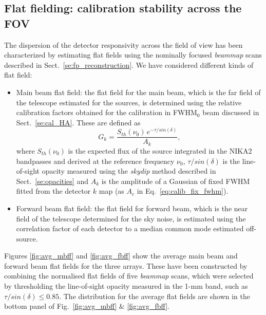 \subsection{Flat fielding: calibration stability across the FOV}


The dispersion of the detector responsivity across the field of view has been characterized by estimating flat fields using the nominally focused \emph{beammap} scans described in Sect.~\ref{se:fp_reconstruction}. We have considered different kinds of flat field:
\begin{itemize}
\item Main beam flat field: the flat field for the main beam, which is the far field of the telescope estimated for the sources, is determined using the relative calibration factors obtained for the calibration in FWHM$_{0}$ beam discussed in Sect.~\ref{se:cal_HA}. These are defined as
  \begin{equation}
    G_k = \frac{S_{th}(\nu_0)\, e^{-\tau/sin(\delta)}}{A_k}, 
  \end{equation}
  where $S_{th}(\nu_0)$ is the expected flux of the source integrated in the NIKA2 bandpasses and derived at the reference frequency $\nu_0$, $\tau/sin(\delta)$ is the line-of-sight opacity measured using the \emph{skydip} method described in Sect.~\ref{se:opacities} and $A_k$ is the amplitude of a Gaussian of fixed FWHM fitted from the detector $k$ map (as $A_{c}$ in Eq.~\ref{eq:calib_fix_fwhm}).
\item Forward beam flat field: the flat field for forward beam, which is the near field of the telescope determined for the sky noise, is estimated using the correlation factor of each detector to a median common mode estimated off-source.
\end{itemize}

Figures \ref{fig:avg_mbff} and \ref{fig:avg_fbff} show the average main beam and forward beam flat fields for the three arrays. These have been constructed by combining the normalised flat fields of five \emph{beammap} scans, which were selected by thresholding the line-of-sight opacity measured in the 1-mm band, such as $\tau/sin(\delta) \leq 0.85$. The distribution for the average flat fields are shown in the bottom panel of Fig.~\ref{fig:avg_mbff} $\&$ \ref{fig:avg_fbff}.

